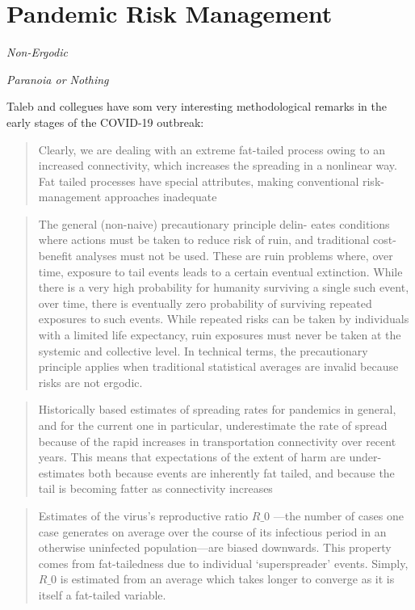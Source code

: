 \documentclass[
]{book}
\begin{document}
\hypertarget{pandemic-risk-management}{%
\section{Pandemic Risk Management}\label{pandemic-risk-management}}

\emph{Non-Ergodic}

\emph{Paranoia or Nothing}

Taleb and collegues have som very interesting methodological
remarks in the early stages of the COVID-19 outbreak:

\begin{quote}
Clearly, we are dealing with an extreme fat-tailed process
owing to an increased connectivity, which increases the
spreading in a nonlinear way. Fat tailed processes
have special attributes, making conventional risk-management
approaches inadequate
\end{quote}

\begin{quote}
The general (non-naive) precautionary principle delin-
eates conditions where actions must be taken to reduce risk
of ruin, and traditional cost-benefit analyses must not be used.
These are ruin problems where, over time, exposure to tail
events leads to a certain eventual extinction. While there
is a very high probability for humanity surviving a single
such event, over time, there is eventually zero probability of
surviving repeated exposures to such events. While repeated
risks can be taken by individuals with a limited life expectancy,
ruin exposures must never be taken at the systemic and
collective level. In technical terms, the precautionary principle
applies when traditional statistical averages are invalid because
risks are not ergodic.
\end{quote}

\begin{quote}
Historically based estimates of spreading
rates for pandemics in general, and for the current one in
particular, underestimate the rate of spread because of the
rapid increases in transportation connectivity over recent years.
This means that expectations of the extent of harm are under-
estimates both because events are inherently fat tailed, and
because the tail is becoming fatter as connectivity increases
\end{quote}

\begin{quote}
Estimates of the virus's reproductive
ratio \(R\_{0}\) ---the number of cases one case generates on average
over the course of its infectious period in an otherwise
uninfected population---are biased downwards. This property
comes from fat-tailedness due to individual `superspreader'
events. Simply,\(R\_{0}\) is estimated from an average which takes
longer to converge as it is itself a fat-tailed variable.
\end{quote}
\end{document}
